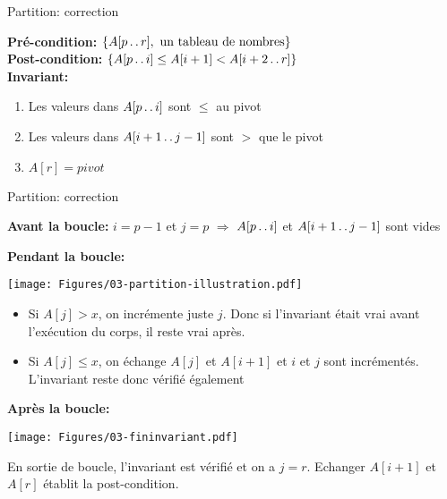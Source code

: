 \begin{frame}{Partition: correction}

\begin{center}\small
\end{center}

{\bf Pré-condition:} $\{A[p\mathinner{\ldotp\ldotp} r],\mbox{ un tableau de nombres}\}$\\
{\bf Post-condition:} $\{A[p\mathinner{\ldotp\ldotp} i]\le A[i+1]< A[i+2\mathinner{\ldotp\ldotp} r]\}$\\
{\bf Invariant:}
\begin{enumerate}
\item Les valeurs dans $A[p\mathinner{\ldotp\ldotp} i]$ sont $\leq$ au pivot
\item Les valeurs dans $A[i+1\mathinner{\ldotp\ldotp} j-1]$ sont $>$ que le pivot
\item $A[r]=pivot$
\end{enumerate}

\end{frame}


\begin{frame}{Partition: correction}

{\bf Avant la boucle:} $i=p-1$ et $j=p$ $\Rightarrow$ $A[p\mathinner{\ldotp\ldotp} i]$ et $A[i+1\mathinner{\ldotp\ldotp} j-1]$ sont vides

\medskip

{\bf Pendant la boucle:}
\centerline{\texttt{[image: Figures/03-partition-illustration.pdf]}}

\begin{itemize}
\item Si $A[j]>x$, on incrémente juste $j$. Donc si l'invariant était vrai avant l'exécution du corps, il reste vrai après.
\item Si $A[j]\le x$, on échange $A[j]$ et $A[i+1]$ et $i$ et $j$ sont incrémentés. L'invariant reste donc vérifié également
\end{itemize}

\medskip

{\bf Après la boucle:} 
\centerline{\texttt{[image: Figures/03-fininvariant.pdf]}}

En sortie de boucle, l'invariant est vérifié et
on a $j=r$. Echanger $A[i+1]$ et $A[r]$ établit la post-condition.

\end{frame}

